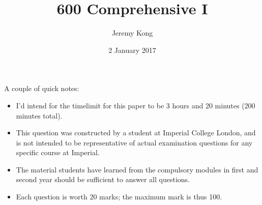 \documentclass[11pt]{article}
\title{600 Comprehensive I}
\author{Jeremy Kong}
\date{2 January 2017}
\begin{document}
\maketitle

\noindent A couple of quick notes:
\begin{itemize}
\item I'd intend for the timelimit for this paper to be 3 hours and 20 minutes (200 minutes total).
\item This question was constructed by a student at Imperial College London, and is not intended to be representative of actual examination questions for any specific course at Imperial.
\item The material students have learned from the compulsory modules in first and second year should be sufficient to answer all questions.
\item Each question is worth 20 marks; the maximum mark is thus 100.
\end{itemize}

\newpage
$\:$
\newpage 
\end{document}
